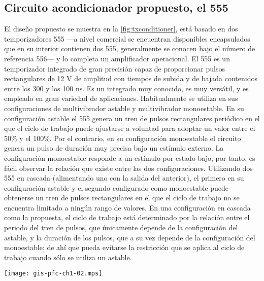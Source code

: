 \subsection[Circuito acondicionador propuesto]{Circuito acondicionador
propuesto, el 555}

El diseño propuesto se muestra en la \cref{fig:txconditioner}, está basado
en dos temporizadores 555 ---a nivel comercial se encuentran disponibles
encapsulados que en su interior contienen dos 555, generalmente se conocen
bajo el número de referencia 556--- y lo completa un amplificador
operacional. El 555 es un temporizador integrado de gran precisión capaz de
proporcionar pulsos rectangulares de 12 V de amplitud con tiempos de subida
y de bajada contenidos entre los 300 y los 100 ns. Es un integrado muy
conocido, es muy versátil, y es empleado en gran variedad de aplicaciones.
Habitualmente se utiliza en sus configuraciones de multivibrador astable y
multivibrador monoestable. En su configuración astable el 555 genera un
tren de pulsos rectangulares periódico en el que el ciclo de trabajo puede
ajustarse a voluntad para adoptar un valor entre el 50\% y el 100\%. Por el
contrario, en su configuración monoestable el circuito genera un pulso de
duración muy precisa bajo un estímulo externo. La configuración monoestable
responde a un estímulo por estado bajo, por tanto, es fácil observar la
relación que existe entre las dos configuraciones. Utilizando dos 555 en
cascada (alimentando uno con la salida del anterior), el primero en su
configuración astable y el segundo configurado como monoestable puede
obtenerse un tren de pulsos rectangulares en el que el ciclo de trabajo no
se encuentra limitado a ningún rango de valores. En una configuración en
cascada como la propuesta, el ciclo de trabajo está determinado por la
relación entre el periodo del tren de pulsos, que únicamente depende de la
configuración del astable, y la duración de los pulsos, que a su vez
depende de la configuración del monoestable; de ahí que pueda evitarse la
restricción que se aplica al ciclo de trabajo cuando sólo se utiliza un
astable.

\begin{sidewaysfigure}
	\begin{center}
		\texttt{[image: gis-pfc-ch1-02.mps]}
	\end{center}
	\caption[Circuito acondicionador de la sección de emisión]{Circuito
	propuesto para acondicionar el actuador de ultrasonidos. Para
	elaborar la figura se ha utilizado el  y el 
	de Texas Instruments.}
	\label{fig:txconditioner}
\end{sidewaysfigure}

